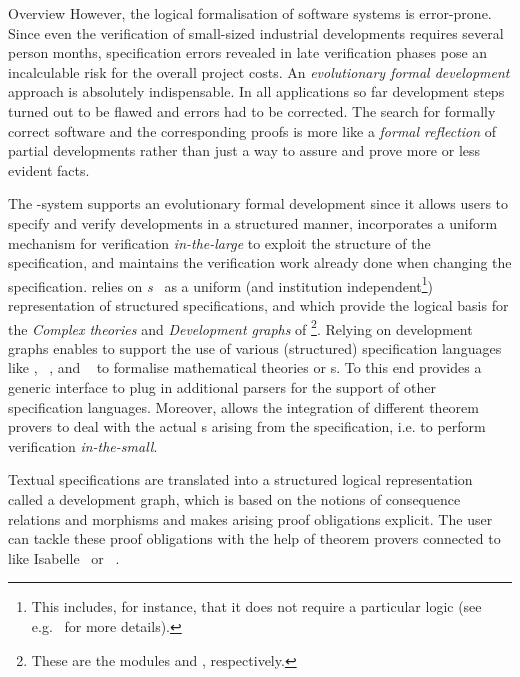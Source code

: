 \begin{omgroup}[id=maya,short=Maya,creators={autexier,hutter,mossakowski,shairer}]
\begin{omgroup}{Overview}
However, the logical formalisation of software systems is error-prone.  Since even the
verification of small-sized industrial developments requires several person months,
specification errors revealed in late verification phases pose an incalculable risk for
the overall project costs. An {\emph{evolutionary formal
    development}} approach is absolutely
indispensable. In all applications so far development steps turned out to be flawed and
errors had to be corrected. The search for formally correct software and the corresponding
proofs is more like a {\emph{formal reflection}} of partial developments rather than just
a way to assure and prove more or less evident facts.

The {\maya}-system supports an evolutionary formal development since it allows users to
specify and verify developments in a structured manner, incorporates a uniform mechanism
for verification {\emph{in-the-large}} to exploit the
structure of the specification, and maintains the verification work already done when
changing the specification. {\maya} relies on
{\emph{s}}~\cite{AH-05-a,Hutter:mocsv00} as a uniform (and
institution independent\footnote{This includes, for instance, that it does not require a
  particular logic (see e.g.~\cite{MAH-06-a} for more details).})  representation of
structured specifications, and which provide the logical basis for the {\emph{Complex
    theories}} and {\emph{Development graphs}} of {\omdoc}\footnote{These are the modules
  {} and {}, respectively.}.  Relying on development graphs
enables {\maya} to support the use of various (structured) specification languages like
{\omdoc}, {\casl}~\cite{CoFI:2004:CASL-RM}, and {\vsesl}~\cite{VSE00} to formalise
mathematical theories or
{s}.  To this end {\maya} provides a generic
interface to plug in additional parsers for the support of other specification languages.
Moreover, {\maya} allows the integration of different theorem provers to deal with the
actual {s} arising from the specification, i.e.  to perform
verification {\emph{in-the-small}}.

Textual specifications are translated into a structured logical representation called a
development graph, which is based on the notions of consequence relations and morphisms
and makes arising proof obligations explicit.  The user can tackle these proof obligations
with the help of theorem provers connected to {\maya} like Isabelle~\cite{Paulson:iagtp94}
or {\inka}~\cite{INKA5}.


\end{omgroup}
\end{omgroup}
